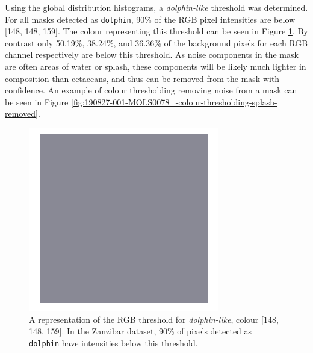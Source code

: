 Using the global distribution histograms, a \textit{dolphin-like} threshold was determined. For all masks detected as \texttt{dolphin}, 90\% of the RGB pixel intensities are below [148, 148, 159]. The colour representing this threshold can be seen in Figure \ref{fig:colour-threshold}. By contrast only 50.19\%, 38.24\%, and 36.36\% of the background pixels for each RGB channel respectively are below this threshold. As noise components in the mask are often areas of water or splash, these components will be likely much lighter in composition than cetaceans, and thus can be removed from the mask with confidence. An example of colour thresholding removing noise from a mask can be seen in Figure \ref{fig:190827-001-MOLS0078_-colour-thresholding-splash-removed}.
 
 \begin{figure}
 	\begin{center}
 		\includegraphics[scale=0.3]{Chapter4/figs/148-148-159.png}
 	\end{center}
 	\caption{A representation of the RGB threshold for \textit{dolphin-like}, colour [148, 148, 159]. In the Zanzibar dataset, 90\% of pixels detected as \texttt{dolphin} have intensities below this threshold.}\label{fig:colour-threshold}
 \end{figure}

